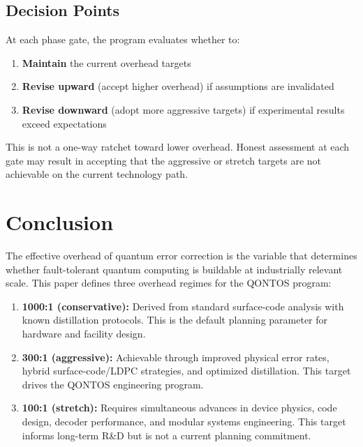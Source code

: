 \documentclass[conference]{IEEEtran}
\begin{document}
\subsection{Decision Points}

At each phase gate, the program evaluates whether to:

\begin{enumerate}
\item \textbf{Maintain} the current overhead targets
\item \textbf{Revise upward} (accept higher overhead) if assumptions are invalidated
\item \textbf{Revise downward} (adopt more aggressive targets) if experimental results exceed expectations
\end{enumerate}

This is not a one-way ratchet toward lower overhead. Honest assessment at each gate may result in accepting that the aggressive or stretch targets are not achievable on the current technology path.

\section{Conclusion}

The effective overhead of quantum error correction is the variable that determines whether fault-tolerant quantum computing is buildable at industrially relevant scale. This paper defines three overhead regimes for the QONTOS program:

\begin{enumerate}
\item \textbf{1000:1 (conservative):} Derived from standard surface-code analysis with known distillation protocols. This is the default planning parameter for hardware and facility design.

\item \textbf{300:1 (aggressive):} Achievable through improved physical error rates, hybrid surface-code/LDPC strategies, and optimized distillation. This target drives the QONTOS engineering program.

\item \textbf{100:1 (stretch):} Requires simultaneous advances in device physics, code design, decoder performance, and modular systems engineering. This target informs long-term R\&D but is not a current planning commitment.
\end{enumerate}
\end{document}

